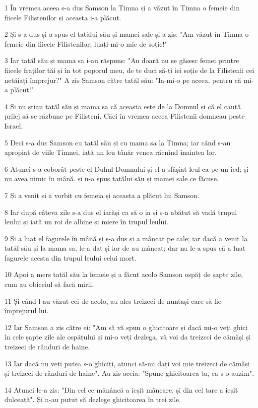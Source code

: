 \par 1 În vremea aceea s-a dus Samson la Timna și a văzut în Timna o femeie din fiicele Filistenilor și aceasta i-a plăcut.
\par 2 Și s-a dus și a spus el tatălui său și mamei sale și a zis: "Am văzut în Timna o femeie din fiicele Filistenilor; luați-mi-o mie de soție!"
\par 3 Iar tatăl său și mama sa i-au răspuns: "Au doară nu se găsesc femei printre fiicele fraților tăi și în tot poporul meu, de te duci să-ți iei soție de la Filistenii cei netăiați împrejur?" A zis Samson către tatăl său: "Ia-mi-o pe aceea, pentru că mi-a plăcut!"
\par 4 Și nu știau tatăl său și mama sa că aceasta este de la Domnul și că el caută prilej să se răzbune pe Filisteni. Căci în vremea aceea Filistenii domneau peste Israel.
\par 5 Deci s-a dus Samson cu tatăl său și cu mama sa la Timna; iar când s-au apropiat de viile Timnei, iată un leu tânăr venea răcnind înaintea lor.
\par 6 Atunci s-a coborât peste el Duhul Domnului și el a sfâșiat leul ca pe un ied; și nu avea nimic în mână. și n-a spus tatălui său și mamei sale ce făcuse.
\par 7 Și a venit și a vorbit cu femeia și aceasta a plăcut lui Samson.
\par 8 Iar după câteva zile s-a dus el iarăși ca să o ia și s-a abătut să vadă trupul leului și iată un roi de albine și miere în trupul leului.
\par 9 Și a luat el fagurele în mână și s-a dus și a mâncat pe cale; iar dacă a venit la tatăl său și la mama sa, le-a dat și lor de au mâncat; dar nu le-a spus că a luat fagurele acesta din trupul leului celui mort.
\par 10 Apoi a mers tatăl său la femeie și a făcut acolo Samson ospăț de șapte zile, cum au obiceiul să facă mirii.
\par 11 Și când l-au văzut cei de acolo, au ales treizeci de nuntași care să fie împrejurul lui.
\par 12 Iar Samson a zis către ei: "Am să vă spun o ghicitoare și dacă mi-o veți ghici în cele șapte zile ale ospățului și mi-o veți dezlega, vă voi da treizeci de cămăși și treizeci de rânduri de haine.
\par 13 Iar dacă nu veți putea s-o ghiciți, atunci să-mi dați voi mie treizeci de cămăși și treizeci de rânduri de haine". Au zis aceia: "Spune ghicitoarea ta, ca s-o auzim".
\par 14 Atunci le-a zis: "Din cel ce mănâncă a ieșit mâncare, și din cel tare a ieșit dulceață". Și n-au putut să dezlege ghicitoarea în trei zile.
